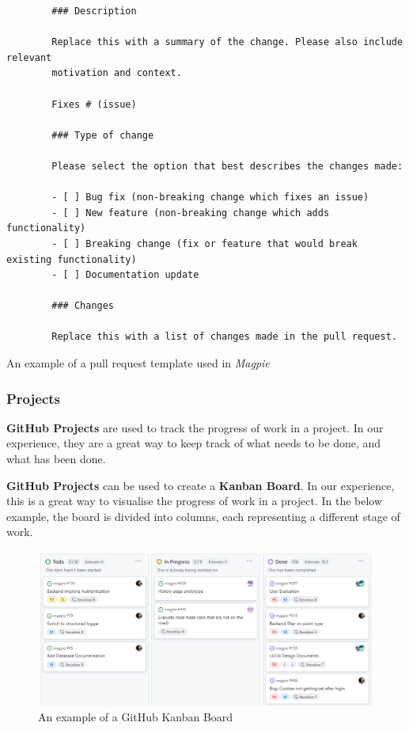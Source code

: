 \begin{listing}[htbp]
    \centering{}
    \begin{verbatim}
        ### Description

        Replace this with a summary of the change. Please also include relevant
        motivation and context.

        Fixes # (issue)

        ### Type of change

        Please select the option that best describes the changes made:

        - [ ] Bug fix (non-breaking change which fixes an issue)
        - [ ] New feature (non-breaking change which adds functionality)
        - [ ] Breaking change (fix or feature that would break existing functionality)
        - [ ] Documentation update

        ### Changes

        Replace this with a list of changes made in the pull request.
    \end{verbatim}
    \caption{An example of a pull request template used in \textit{Magpie}}
\end{listing}

\newpage{}

\subsubsection{Projects}
\textbf{GitHub Projects} are used to track the progress of work in a project. In
our experience, they are a great way to keep track of what needs to be done, and
what has been done.

\textbf{GitHub Projects} can be used to create a \textbf{Kanban Board}. In our
experience, this is a great way to visualise the progress of work in a project.
In the below example, the board is divided into columns, each representing a
different stage of work.

\begin{figure}[htbp]
    \centering{}
    \includegraphics[width=\textwidth]{images/github_kanban.png}
    \caption{An example of a GitHub Kanban Board}
\end{figure}

